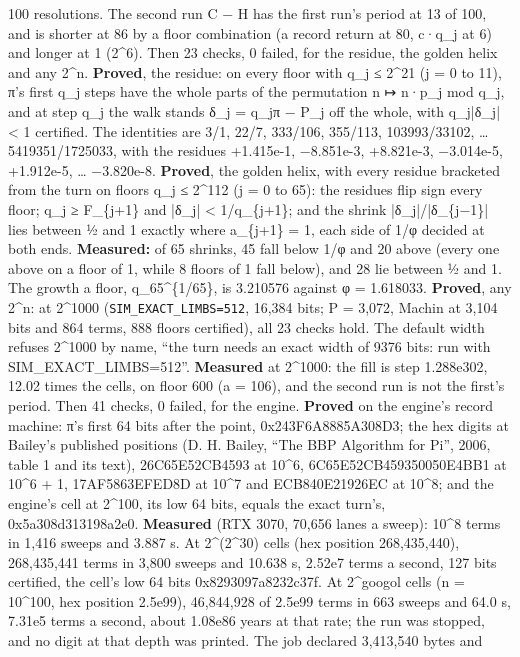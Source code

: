 \begin{description}
100 resolutions. The second run C − H has the first run's period at 13 of 100, and is shorter at 86 by a floor combination (a record return at 80, c·q\_\allowbreak{}j at 6) and longer at 1 (2\textasciicircum{}6). Then 23 checks, 0 failed, for the residue, the golden helix and any 2\textasciicircum{}n. \textbf{Proved}, the residue: on every floor with q\_\allowbreak{}j ≤ 2\textasciicircum{}21 (j = 0 to 11), π's first q\_\allowbreak{}j steps have the whole parts of the permutation n ↦ n·p\_\allowbreak{}j mod q\_\allowbreak{}j, and at step q\_\allowbreak{}j the walk stands δ\_\allowbreak{}j = q\_\allowbreak{}jπ − P\_\allowbreak{}j off the whole, with q\_\allowbreak{}j|δ\_\allowbreak{}j| < 1 certified. The identities are 3/1, 22/7, 333/106, 355/113, 103993/33102, … 5419351/1725033, with the residues +1.415e-1, −8.851e-3, +8.821e-3, −3.014e-5, +1.912e-5, … −3.820e-8. \textbf{Proved}, the golden helix, with every residue bracketed from the turn on floors q\_\allowbreak{}j ≤ 2\textasciicircum{}112 (j = 0 to 65): the residues flip sign every floor; q\_\allowbreak{}j ≥ F\_\allowbreak{}\{j+1\} and |δ\_\allowbreak{}j| < 1/q\_\allowbreak{}\{j+1\}; and the shrink |δ\_\allowbreak{}j|/|δ\_\allowbreak{}\{j−1\}| lies between ½ and 1 exactly where a\_\allowbreak{}\{j+1\} = 1, each side of 1/φ decided at both ends. \textbf{Measured:} of 65 shrinks, 45 fall below 1/φ and 20 above (every one above on a floor of 1, while 8 floors of 1 fall below), and 28 lie between ½ and 1. The growth a floor, q\_\allowbreak{}65\textasciicircum{}\{1/65\}, is 3.210576 against φ = 1.618033. \textbf{Proved}, any 2\textasciicircum{}n: at 2\textasciicircum{}1000 (\texttt{SIM\_\allowbreak{}EXACT\_\allowbreak{}LIMBS=512}, 16,384 bits; P = 3,072, Machin at 3,104 bits and 864 terms, 888 floors certified), all 23 checks hold. The default width refuses 2\textasciicircum{}1000 by name, “the turn needs an exact width of 9376 bits: run with SIM\_\allowbreak{}EXACT\_\allowbreak{}LIMBS=512”. \textbf{Measured} at 2\textasciicircum{}1000: the fill is step 1.288e302, 12.02 times the cells, on floor 600 (a = 106), and the second run is not the first's period. Then 41 checks, 0 failed, for the engine. \textbf{Proved} on the engine's record machine: π's first 64 bits after the point, 0x243F6A8885A308D3; the hex digits at Bailey's published positions (D. H. Bailey, “The BBP Algorithm for Pi”, 2006, table 1 and its text), 26C65E52CB4593 at 10\textasciicircum{}6, 6C65E52CB459350050E4BB1 at 10\textasciicircum{}6 + 1, 17AF5863EFED8D at 10\textasciicircum{}7 and ECB840E21926EC at 10\textasciicircum{}8; and the engine's cell at 2\textasciicircum{}100, its low 64 bits, equals the exact turn's, 0x5a308d313198a2e0. \textbf{Measured} (RTX 3070, 70,656 lanes a sweep): 10\textasciicircum{}8 terms in 1,416 sweeps and 3.887 s. At 2\textasciicircum{}(2\textasciicircum{}30) cells (hex position 268,435,440), 268,435,441 terms in 3,800 sweeps and 10.638 s, 2.52e7 terms a second, 127 bits certified, the cell's low 64 bits 0x8293097a8232c37f. At 2\textasciicircum{}googol cells (n = 10\textasciicircum{}100, hex position 2.5e99), 46,844,928 of 2.5e99 terms in 663 sweeps and 64.0 s, 7.31e5 terms a second, about 1.08e86 years at that rate; the run was stopped, and no digit at that depth was printed. The job declared 3,413,540 bytes and 
\end{description}
